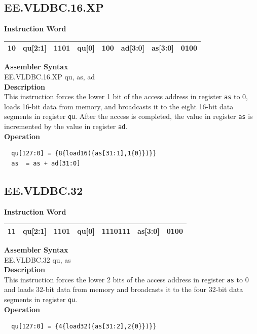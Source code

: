 \clearpage
\subsection{EE.VLDBC.16.XP}\label{instruction:EEVLDBC16XP}
\setlength\tabcolsep{6pt}
\textbf{Instruction Word} \\
\begin{tabular}{|c|c|c|c|c|c|c|c|}
	\hline
	10 & qu[2:1] & 1101 & qu[0] & 100 & ad[3:0] & as[3:0] & 0100 \\
	\hline
\end{tabular}

\textbf{Assembler Syntax} \\
EE.VLDBC.16.XP qu, as, ad \\
\textbf{Description} \\
This instruction forces the lower 1 bit of the access address in register \lstinline{as} to 0, loads 16-bit data from memory, and broadcasts it to the eight 16-bit data segments in register \lstinline{qu}. After the access is completed, the value in register \lstinline{as} is incremented by the value in register \lstinline{ad}.\\
\textbf{Operation}
\begin{lstlisting}
  qu[127:0] = {8{load16({as[31:1],1{0}})}}
  as  = as + ad[31:0]
\end{lstlisting}

\clearpage
\subsection{EE.VLDBC.32}\label{instruction:EEVLDBC32}
\setlength\tabcolsep{6pt}
\textbf{Instruction Word} \\
\begin{tabular}{|c|c|c|c|c|c|c|}
	\hline
	11 & qu[2:1] & 1101 & qu[0] & 1110111 & as[3:0] & 0100 \\
	\hline
\end{tabular}

\textbf{Assembler Syntax} \\
EE.VLDBC.32 qu, as \\
\textbf{Description} \\
This instruction forces the lower 2 bits of the access address in register \lstinline{as} to 0 and loads 32-bit data from memory and broadcasts it to the four 32-bit data segments in register \lstinline{qu}.\\
\textbf{Operation}
\begin{lstlisting}
  qu[127:0] = {4{load32({as[31:2],2{0}})}}
\end{lstlisting}

